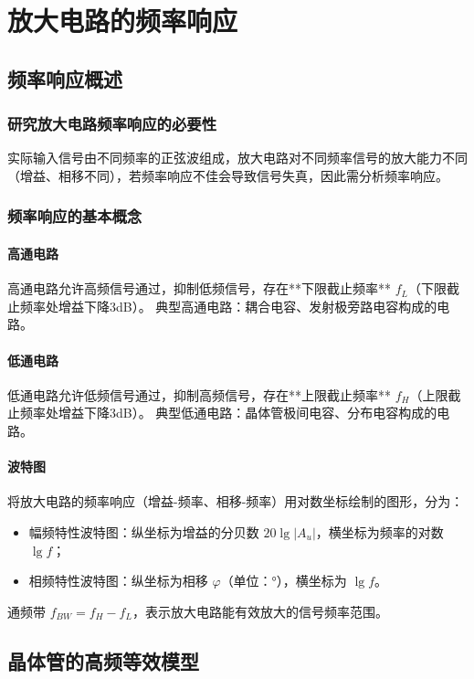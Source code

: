 \chapter{放大电路的频率响应}

\section{频率响应概述}
\subsection{研究放大电路频率响应的必要性}
实际输入信号由不同频率的正弦波组成，放大电路对不同频率信号的放大能力不同（增益、相移不同），若频率响应不佳会导致信号失真，因此需分析频率响应。

\subsection{频率响应的基本概念}
\subsubsection{\texorpdfstring{高通电路}{高通电路}}
高通电路允许高频信号通过，抑制低频信号，存在**下限截止频率** $f_L$（下限截止频率处增益下降3dB）。
典型高通电路：耦合电容、发射极旁路电容构成的电路。

\subsubsection{\texorpdfstring{低通电路}{低通电路}}
低通电路允许低频信号通过，抑制高频信号，存在**上限截止频率** $f_H$（上限截止频率处增益下降3dB）。
典型低通电路：晶体管极间电容、分布电容构成的电路。

\subsubsection{\texorpdfstring{波特图}{波特图}}
将放大电路的频率响应（增益-频率、相移-频率）用对数坐标绘制的图形，分为：
\begin{itemize}
    \item 幅频特性波特图：纵坐标为增益的分贝数 $20\lg|A_u|$，横坐标为频率的对数 $\lg f$；
    \item 相频特性波特图：纵坐标为相移 $\varphi$（单位：°），横坐标为 $\lg f$。
\end{itemize}
通频带 $f_{BW} = f_H - f_L$，表示放大电路能有效放大的信号频率范围。

\section{\texorpdfstring{晶体管的高频等效模型}{晶体管的高频等效模型}}
